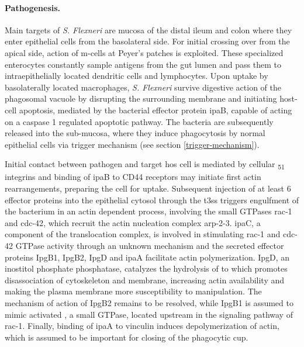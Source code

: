 \paragraph{Pathogenesis.}
Main targets of \textit{S. Flexneri} are mucosa of the distal ileum and colon where they enter epithelial cells from the basolateral side. For initial crossing over from the apical side, action of \gls{m-cells} at Peyer's patches is exploited. These specialized enterocytes constantly sample antigens from the gut lumen and pass them to intraepithelially located dendritic cells and lymphocytes. Upon uptake by basolaterally located macrophages, \textit{S. Flexneri} survive digestive action of the phagosomal vacuole by disrupting the surrounding membrane and initiating host-cell apoptosis, mediated by the bacterial effector protein \gls{ipa}B, capable of acting on a caspase 1 regulated apoptotic pathway. The bacteria are subsequently released into the sub-mucosa, where they induce phagocytosis by normal epithelial cells via trigger mechanism (see section \ref{trigger-mechanism}).


Initial contact between pathogen and target hos cell is mediated by cellular \textalpha\textsubscript{5}\textbeta\textsubscript{1} integrins and binding of \gls{ipa}B to CD44 receptors may initiate first actin rearrangements, preparing the cell for uptake. Subsequent injection of at least 6 effector proteins into the epithelial cytosol through the \gls{t3ss} triggers engulfment of the bacterium in an actin dependent process, involving the small GTPases \gls{rac-1} and \gls{cdc-42}, which recruit the actin nucleation complex \gls{arp-2-3}. \Gls{ipa}C, a component of the translocation complex, is involved in stimulating \gls{rac-1} and \gls{cdc-42} GTPase activity through an unknown mechanism and the secreted effector proteins IpgB1, IpgB2, IpgD and \gls{ipa}A facilitate actin polymerization. IpgD, an inostitol phosphate phosphatase, catalyzes the hydrolysis of  to  which promotes disassociation of cytoskeleton and membrane, increasing actin availability and making the plasma membrane more susceptibility to manipulation. The mechanism of action of IpgB2 remains to be resolved, while IpgB1 is assumed to mimic activated , a small GTPase, located upstream in the signaling pathway of \gls{rac-1}. Finally, binding of \gls{ipa}A to vinculin induces depolymerization of actin, which is assumed to be important for closing of the phagocytic cup.

